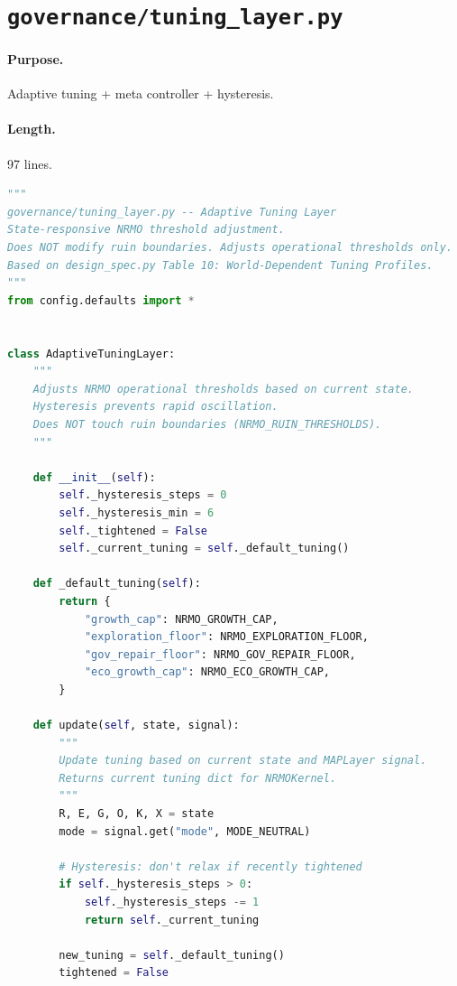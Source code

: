 \section{\texttt{governance/tuning\_layer.py}}
\label{app:code:governance-tuning-layer-py}

\paragraph{Purpose.} Adaptive tuning + meta controller + hysteresis.

\paragraph{Length.} 97 lines.

\begin{lstlisting}[language=Python,basicstyle=\ttfamily\scriptsize,frame=single,breaklines=true]
"""
governance/tuning_layer.py -- Adaptive Tuning Layer
State-responsive NRMO threshold adjustment.
Does NOT modify ruin boundaries. Adjusts operational thresholds only.
Based on design_spec.py Table 10: World-Dependent Tuning Profiles.
"""
from config.defaults import *


class AdaptiveTuningLayer:
    """
    Adjusts NRMO operational thresholds based on current state.
    Hysteresis prevents rapid oscillation.
    Does NOT touch ruin boundaries (NRMO_RUIN_THRESHOLDS).
    """

    def __init__(self):
        self._hysteresis_steps = 0
        self._hysteresis_min = 6
        self._tightened = False
        self._current_tuning = self._default_tuning()

    def _default_tuning(self):
        return {
            "growth_cap": NRMO_GROWTH_CAP,
            "exploration_floor": NRMO_EXPLORATION_FLOOR,
            "gov_repair_floor": NRMO_GOV_REPAIR_FLOOR,
            "eco_growth_cap": NRMO_ECO_GROWTH_CAP,
        }

    def update(self, state, signal):
        """
        Update tuning based on current state and MAPLayer signal.
        Returns current tuning dict for NRMOKernel.
        """
        R, E, G, O, K, X = state
        mode = signal.get("mode", MODE_NEUTRAL)

        # Hysteresis: don't relax if recently tightened
        if self._hysteresis_steps > 0:
            self._hysteresis_steps -= 1
            return self._current_tuning

        new_tuning = self._default_tuning()
        tightened = False


\end{lstlisting}
